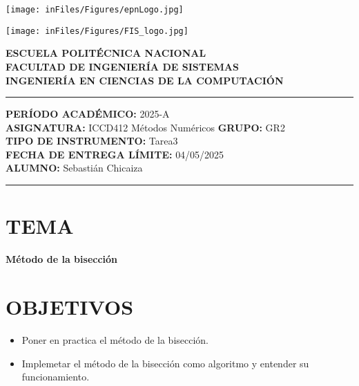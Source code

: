 \documentclass[12pt]{article}
\begin{document}
\begin{minipage}{0.45\textwidth}
    \texttt{[image: inFiles/Figures/epnLogo.jpg]}
\end{minipage}
\hfill
\begin{minipage}{0.45\textwidth}
    \raggedleft
    \texttt{[image: inFiles/Figures/FIS\_logo.jpg]}
\end{minipage}

\vspace{0.5cm}

\begin{center}
    \textbf{ESCUELA POLITÉCNICA NACIONAL}\\[0.2cm]
    \textbf{FACULTAD DE INGENIERÍA DE SISTEMAS}\\[0.2cm]
    \textbf{INGENIERÍA EN CIENCIAS DE LA COMPUTACIÓN}
\end{center}

\vspace{0.5cm}
\hrule
\vspace{0.5cm}

\noindent\textbf{PERÍODO ACADÉMICO:} 2025-A\\[0.2cm]
\noindent\textbf{ASIGNATURA:} ICCD412 Métodos Numéricos \hfill \textbf{GRUPO:} GR2\\[0.2cm]
\noindent\textbf{TIPO DE INSTRUMENTO:} Tarea3\\[0.2cm]
\noindent\textbf{FECHA DE ENTREGA LÍMITE:} {04/05/2025}\\[0.2cm]
\noindent\textbf{ALUMNO:} {Sebastián Chicaiza}

\vspace{0.5cm}
\hrule
\vspace{1cm}


\section*{TEMA}

\begin{center}
    \Large\textbf{Método de la bisección}
\end{center}
\vspace{0.5cm}

\section*{OBJETIVOS}
\begin{itemize}
    \item {Poner en practica el método de la bisección.}
    \item {Implemetar el método de la bisección como algoritmo y entender su funcionamiento.}
\end{itemize}
\end{document}
